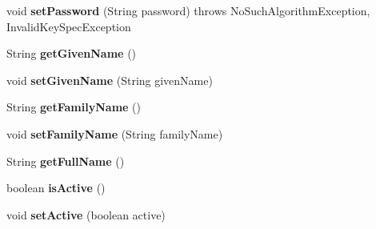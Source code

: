 \begin{DoxyCompactItemize}
\item 
\hypertarget{classit_1_1polimi_1_1se_1_1calcare_1_1entities_1_1User_afca81a9b6a45d4553311ada249f47a25}{}void {\bfseries set\+Password} (String password)  throws No\+Such\+Algorithm\+Exception, Invalid\+Key\+Spec\+Exception \label{classit_1_1polimi_1_1se_1_1calcare_1_1entities_1_1User_afca81a9b6a45d4553311ada249f47a25}

\item 
\hypertarget{classit_1_1polimi_1_1se_1_1calcare_1_1entities_1_1User_a54e0f0d6a87b4aee121a61550b4c2402}{}String {\bfseries get\+Given\+Name} ()\label{classit_1_1polimi_1_1se_1_1calcare_1_1entities_1_1User_a54e0f0d6a87b4aee121a61550b4c2402}

\item 
\hypertarget{classit_1_1polimi_1_1se_1_1calcare_1_1entities_1_1User_a1ffa1bbf99911a6fc16072b31054eb41}{}void {\bfseries set\+Given\+Name} (String given\+Name)\label{classit_1_1polimi_1_1se_1_1calcare_1_1entities_1_1User_a1ffa1bbf99911a6fc16072b31054eb41}

\item 
\hypertarget{classit_1_1polimi_1_1se_1_1calcare_1_1entities_1_1User_a606f2b3ccd41ac6dabc0aae2c13d1a30}{}String {\bfseries get\+Family\+Name} ()\label{classit_1_1polimi_1_1se_1_1calcare_1_1entities_1_1User_a606f2b3ccd41ac6dabc0aae2c13d1a30}

\item 
\hypertarget{classit_1_1polimi_1_1se_1_1calcare_1_1entities_1_1User_a931b2b94c6b3c3d9e939e1abb05fbbd0}{}void {\bfseries set\+Family\+Name} (String family\+Name)\label{classit_1_1polimi_1_1se_1_1calcare_1_1entities_1_1User_a931b2b94c6b3c3d9e939e1abb05fbbd0}

\item 
\hypertarget{classit_1_1polimi_1_1se_1_1calcare_1_1entities_1_1User_a8a580bed776f7123015da79f4c6d9a3c}{}String {\bfseries get\+Full\+Name} ()\label{classit_1_1polimi_1_1se_1_1calcare_1_1entities_1_1User_a8a580bed776f7123015da79f4c6d9a3c}

\item 
\hypertarget{classit_1_1polimi_1_1se_1_1calcare_1_1entities_1_1User_abaf43f595f1a95e4d5249004eb4a2baa}{}boolean {\bfseries is\+Active} ()\label{classit_1_1polimi_1_1se_1_1calcare_1_1entities_1_1User_abaf43f595f1a95e4d5249004eb4a2baa}

\item 
\hypertarget{classit_1_1polimi_1_1se_1_1calcare_1_1entities_1_1User_afb673a8a8fd5f065f433df18a173c360}{}void {\bfseries set\+Active} (boolean active)\label{classit_1_1polimi_1_1se_1_1calcare_1_1entities_1_1User_afb673a8a8fd5f065f433df18a173c360}


\end{DoxyCompactItemize}
